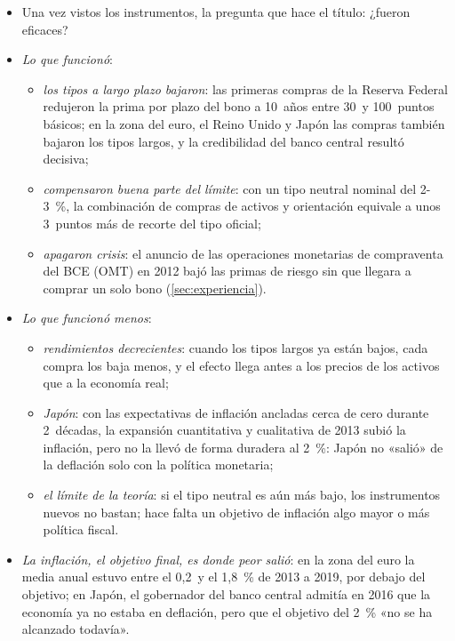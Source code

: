\documentclass[11pt]{article}
\begin{document}
\begin{itemize}
\item Una vez vistos los instrumentos, la pregunta que hace el título: ¿fueron eficaces?
\item \emph{Lo que funcionó}:
  \begin{itemize}
  \item \emph{los tipos a largo plazo bajaron}: las primeras compras de la Reserva Federal redujeron la prima por plazo del bono a 10~años entre 30~y 100~puntos básicos\nocite{GagnonEtAl2011Financial}; en la zona del euro, el Reino Unido y Japón las compras también bajaron los tipos largos, y la credibilidad del banco central resultó decisiva\nocite{DellAricciaRabanalSandri2018};
  \item \emph{compensaron buena parte del límite}: con un tipo neutral nominal del 2-3~\%, la combinación de compras de activos y orientación equivale a unos 3~puntos más de recorte del tipo oficial\nocite{Bernanke2020New};
  \item \emph{apagaron crisis}: el anuncio de las operaciones monetarias de compraventa del BCE (OMT) en 2012 bajó las primas de riesgo sin que llegara a comprar un solo bono\nocite{BCE2012OMT} (\ref{sec:experiencia}).
  \end{itemize}
\item \emph{Lo que funcionó menos}:
  \begin{itemize}
  \item \emph{rendimientos decrecientes}: cuando los tipos largos ya están bajos, cada compra los baja menos, y el efecto llega antes a los precios de los activos que a la economía real;
  \item \emph{Japón}: con las expectativas de inflación ancladas cerca de cero durante 2~décadas, la expansión cuantitativa y cualitativa de 2013 subió la inflación, pero no la llevó de forma duradera al 2~\%\nocite{DellAricciaRabanalSandri2018}: Japón no «salió» de la deflación solo con la política monetaria;
  \item \emph{el límite de la teoría}: si el tipo neutral es aún más bajo, los instrumentos nuevos no bastan; hace falta un objetivo de inflación algo mayor o más política fiscal\nocite{Bernanke2020New}.
  \end{itemize}
\item \emph{La inflación, el objetivo final, es donde peor salió}: en la zona del euro la media anual estuvo entre el 0,2~y el 1,8~\% de 2013 a 2019, por debajo del objetivo\nocite{Eurostat2026IAPC}; en Japón, el gobernador del banco central admitía en 2016 que la economía ya no estaba en deflación, pero que el objetivo del 2~\% «no se ha alcanzado todavía»\nocite{Kuroda2016Comprehensive}.

\end{itemize}
\end{document}

